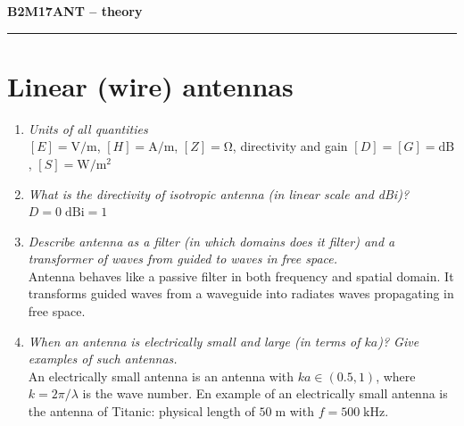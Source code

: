 \documentclass[11pt,a4paper]{article}
\begin{document}

\noindent\LARGE\textbf{B2M17ANT -- theory}\normalsize\\
\noindent\rule{12.5cm}{0.4pt}

\section{Linear (wire) antennas}
\begin{enumerate}
    \item \emph{Units of all quantities}\\
    $[E] = \mathrm V/\mathrm m$, $[H] = \mathrm A/\mathrm m$, $[Z] = \mathrm{\Omega}$, directivity and gain $[D] = [G] = \mathrm{dB}$, $[S] = \mathrm W/\mathrm m^2$

    \item \emph{What is the directivity of isotropic antenna (in linear scale and \emph{dBi})?}\\
    $D = 0 \;\mathrm{dBi} = 1$

    \item \emph{Describe antenna as a filter (in which domains does it filter) and a transformer of waves from guided to waves in free space.}\\
    Antenna behaves like a passive filter in both frequency and spatial domain. It transforms guided waves from a waveguide into radiates waves propagating in free space.

    \item \emph{When an antenna is electrically small and large (in terms of $ka$)? Give examples of such antennas.}\\
    An electrically small antenna is an antenna with $ka \in (0.5, 1)$, where $k = 2\pi/\lambda$ is the wave number. En example of an electrically small antenna is the antenna of Titanic: physical length of $50 \; \mathrm m$ with $f = 500 \; \mathrm{kHz}$.


\end{enumerate}
\end{document}
